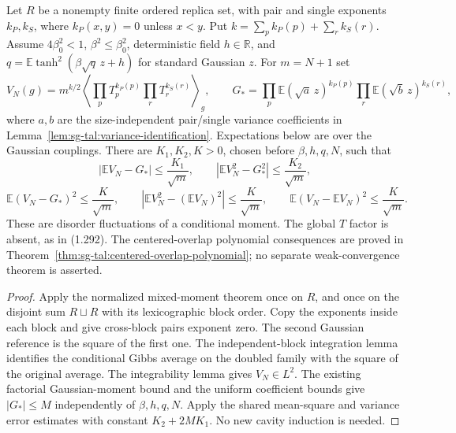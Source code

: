 \begin{theorem}
\label{thm:sg-tal:gibbs-moment-fluctuations}
\leanok
{}
Let $R$ be a nonempty finite ordered replica set, with pair and single exponents
$k_P,k_S$, where $k_P(x,y)=0$ unless $x<y$. Put $k=\sum_p k_P(p)+\sum_r k_S(r)$.
Assume $4\beta_0^2<1$, $\beta^2\le\beta_0^2$, deterministic field $h\in\mathbb R$,
and $q=\mathbb E\tanh^2(\beta\sqrt q\,z+h)$ for standard Gaussian $z$.
For $m=N+1$ set
\[
 V_N(g)=m^{k/2}\left\langle\prod_pT_p^{k_P(p)}\prod_rT_r^{k_S(r)}\right\rangle_g,
 \qquad
 G_* = \prod_p\mathbb E(\sqrt a\,z)^{k_P(p)}
             \prod_r\mathbb E(\sqrt b\,z)^{k_S(r)},
\]
where $a,b$ are the size-independent pair/single variance coefficients in
Lemma~\ref{lem:sg-tal:variance-identification}. Expectations below are over the
Gaussian couplings. There are $K_1,K_2,K>0$, chosen before $\beta,h,q,N$, such that
\[
 |\mathbb E V_N-G_*|\le\frac{K_1}{\sqrt m},\qquad
 |\mathbb E V_N^2-G_*^2|\le\frac{K_2}{\sqrt m},
\]
\[
 \mathbb E(V_N-G_*)^2\le\frac K{\sqrt m},\qquad
 |\mathbb E V_N^2-(\mathbb E V_N)^2|\le\frac K{\sqrt m},\qquad
 \mathbb E(V_N-\mathbb E V_N)^2\le\frac K{\sqrt m}.
\]
These are disorder fluctuations of a conditional moment. The global $T$ factor
is absent, as in (1.292). The centered-overlap polynomial consequences are proved
in Theorem~\ref{thm:sg-tal:centered-overlap-polynomial}; no separate weak-convergence
theorem is asserted.
\end{theorem}
\begin{proof}
\leanok
Apply the normalized mixed-moment theorem once on $R$, and once on the disjoint sum
$R\sqcup R$ with its lexicographic block order. Copy the exponents inside each block
and give cross-block pairs exponent zero. The second Gaussian reference is the
square of the first one. The independent-block integration lemma identifies the
conditional Gibbs average on the doubled family with the square of the original
average. The integrability lemma gives $V_N\in L^2$.
The existing factorial Gaussian-moment bound and the uniform coefficient bounds give
$|G_*|\le M$ independently of $\beta,h,q,N$. Apply the shared mean-square and variance
error estimates with constant $K_2+2M K_1$. No new cavity induction is needed.
\end{proof}

